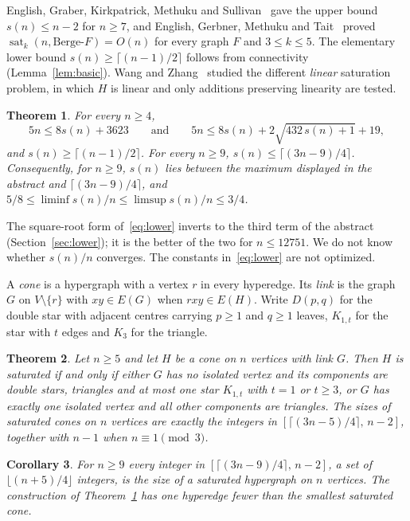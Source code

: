 \documentclass[11pt]{article}
\newtheorem{theorem}{Theorem}
\newtheorem{corollary}[theorem]{Corollary}
\theoremstyle{remark}
\newcommand{\sat}{\operatorname{sat}}
\begin{document}
English, Graber, Kirkpatrick, Methuku and Sullivan~\cite[Theorem~5.7]{EGKMS}
gave the upper bound $s(n)\le n-2$ for $n\ge7$, and English, Gerbner,
Methuku and Tait~\cite{EGMT} proved $\sat_k(n,\text{Berge-}F)=O(n)$ for
every graph $F$ and $3\le k\le5$. The elementary lower bound
$s(n)\ge\lceil(n-1)/2\rceil$ follows from connectivity
(Lemma~\ref{lem:basic}). Wang and Zhang~\cite{WZ} studied the different
\emph{linear} saturation problem, in which $H$ is linear and only additions
preserving linearity are tested.

\begin{theorem}\label{thm:main}
For every $n\ge4$,
\begin{equation}\label{eq:lower}
5n\le 8s(n)+3623\qquad\text{and}\qquad 5n\le 8s(n)+2\sqrt{432\,s(n)+1}+19,
\end{equation}
and $s(n)\ge\lceil(n-1)/2\rceil$. For every $n\ge9$,
$s(n)\le\lceil(3n-9)/4\rceil$. Consequently, for $n\ge9$, $s(n)$ lies
between the maximum displayed in the abstract and $\lceil(3n-9)/4\rceil$,
and $5/8\le\liminf s(n)/n\le\limsup s(n)/n\le 3/4$.
\end{theorem}

The square-root form of~\eqref{eq:lower} inverts to the third term of the
abstract (Section~\ref{sec:lower}); it is the better of the two for
$n\le12751$. We do not know whether $s(n)/n$ converges.
The constants in~\eqref{eq:lower} are not optimized.

A \emph{cone} is a hypergraph with a vertex $r$ in every hyperedge. Its
\emph{link} is the graph $G$ on $V\setminus\{r\}$ with $xy\in E(G)$ when
$rxy\in E(H)$. Write $D(p,q)$ for the double star with adjacent centres
carrying $p\ge1$ and $q\ge1$ leaves, $K_{1,t}$ for the star with $t$
edges and $K_3$ for the triangle.

\begin{theorem}\label{thm:cone}
Let $n\ge5$ and let $H$ be a cone on $n$ vertices with link $G$. Then $H$
is saturated if and only if either $G$ has no isolated vertex and its
components are double stars, triangles and at most one star $K_{1,t}$ with
$t=1$ or $t\ge3$, or $G$ has exactly one isolated vertex and all other
components are triangles. The sizes of saturated cones on $n$ vertices
are exactly the integers in $[\lceil(3n-5)/4\rceil,\,n-2]$, together with
$n-1$ when $n\equiv1\pmod3$.
\end{theorem}

\begin{corollary}\label{cor:interval}
For $n\ge9$ every integer in $[\lceil(3n-9)/4\rceil,\,n-2]$, a set of
$\lfloor(n+5)/4\rfloor$ integers, is the size of a saturated hypergraph on
$n$ vertices. The construction of Theorem~\ref{thm:main} has one hyperedge
fewer than the smallest saturated cone.
\end{corollary}
\end{document}
